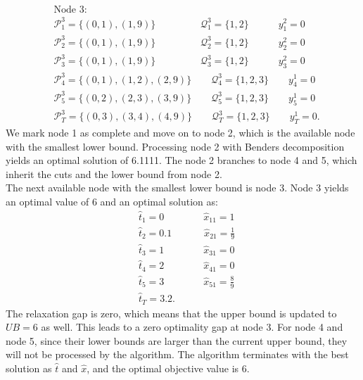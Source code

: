\documentclass[11pt]{article}
\begin{document}
	\begin{align*}
	& \text{Node 3:}\\
	&\mathcal{P}_1^3 = \{(0,1),(1,9)\} \qquad \qquad \;\; \mathcal{Q}_1^3 = \{1,2\} \qquad \quad y_1^2 = 0\\
	&\mathcal{P}_2^3 = \{(0,1),(1,9)\} \qquad \qquad \;\; \mathcal{Q}_2^3 = \{1,2\} \qquad \quad y_2^2 = 0\\
	&\mathcal{P}_3^3 = \{(0,1),(1,9)\} \qquad \qquad \;\; \mathcal{Q}_3^3 = \{1,2\} \qquad \quad y_3^2 = 0\\
	&\mathcal{P}_4^3 = \{(0,1),(1,2),(2,9)\} \qquad  \mathcal{Q}_4^3 = \{1,2,3\} \qquad y_4^1 = 0\\
	&\mathcal{P}_5^3 = \{(0,2),(2,3),(3,9)\} \qquad  \mathcal{Q}_5^3 = \{1,2,3\} \qquad y_5^1 = 0\\
	&\mathcal{P}_T^3 = \{(0,3),(3,4),(4,9)\} \qquad  \mathcal{Q}_T^3 = \{1,2,3\} \qquad y_T^1 = 0.
	\end{align*}
	We mark node 1 as complete and move on to node 2, which is the available node with the smallest lower bound. Processing node 2 with Benders decomposition yields an optimal solution of 6.1111. The node 2 branches to node 4 and 5, which inherit the cuts and the lower bound from node 2. \\
	\newline
	The next available node with the smallest lower bound is node 3. Node 3 yields an optimal value of 6 and an optimal solution as: 
	\begin{align*}
	& \hat{t}_1 = 0 \qquad \qquad \hat{x}_{11} = 1\\
	& \hat{t}_2 = 0.1 \qquad \quad\; \hat{x}_{21} = \frac{1}{9}\\
	& \hat{t}_3 = 1 \qquad \qquad \hat{x}_{31} = 0\\
	& \hat{t}_4 = 2 \qquad \qquad \hat{x}_{41} = 0\\
	& \hat{t}_5 = 3 \qquad \qquad \hat{x}_{51} = \frac{8}{9}\\
	& \hat{t}_T = 3.2.
	\end{align*}
	The relaxation gap is zero, which means that the upper bound is updated to \(UB = 6\) as well. This leads to a zero optimality gap at node 3. For node 4 and node 5, since their lower bounds are larger than the current upper bound, they will not be processed by the algorithm. The algorithm terminates with the best solution as \(\hat{t}\) and \(\hat{x}\), and the optimal objective value is 6.
	
\end{document}
